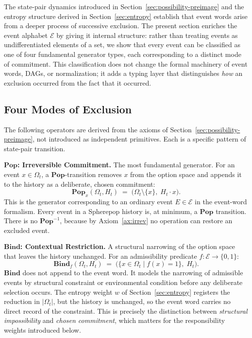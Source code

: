 \documentclass[12pt]{article}
\theoremstyle{plain}
\theoremstyle{definition}
\theoremstyle{remark}
\begin{document}
The state-pair dynamics introduced in Section~\ref{sec:possibility-preimage}
and the entropy structure derived in Section~\ref{sec:entropy} establish that
event words arise from a deeper process of successive exclusion.  The present
section enriches the event alphabet $\mathcal{E}$ by giving it internal
structure: rather than treating events as undifferentiated elements of a set,
we show that every event can be classified as one of four fundamental generator
types, each corresponding to a distinct mode of commitment.  This classification
does not change the formal machinery of event words, DAGs, or normalization;
it adds a typing layer that distinguishes \emph{how} an exclusion occurred from
the fact that it occurred.

\subsection{Four Modes of Exclusion}

The following operators are derived from the axioms of
Section~\ref{sec:possibility-preimage}, not introduced as independent
primitives.  Each is a specific pattern of state-pair transition.

\medskip
\noindent\textbf{$\mathbf{Pop}$: Irreversible Commitment.}
The most fundamental generator.  For an event $x \in \Omega_t$, a
$\mathbf{Pop}$-transition removes $x$ from the option space and appends it
to the history as a deliberate, chosen commitment:
\[
  \mathbf{Pop}_x(\Omega_t, H_t) \;=\; \bigl(\Omega_t \setminus \{x\},\; H_t \cdot x\bigr).
\]
This is the generator corresponding to an ordinary event $E \in \mathcal{E}$
in the event-word formalism.  Every event in a Spherepop history is, at minimum,
a $\mathbf{Pop}$ transition.  There is no $\mathbf{Pop}^{-1}$, because by
Axiom~\ref{ax:irrev} no operation can restore an excluded event.

\medskip
\noindent\textbf{$\mathbf{Bind}$: Contextual Restriction.}
A structural narrowing of the option space that leaves the history unchanged.
For an admissibility predicate $f : \mathcal{E} \to \{0,1\}$:
\[
  \mathbf{Bind}_f(\Omega_t, H_t) \;=\; \bigl(\{x \in \Omega_t \mid f(x) = 1\},\; H_t\bigr).
\]
$\mathbf{Bind}$ does not append to the event word.  It models the narrowing of
admissible events by structural constraint or environmental condition before any
deliberate selection occurs.  The entropy weight $w$ of Section~\ref{sec:entropy}
registers the reduction in $|\Omega_t|$, but the history is unchanged, so the
event word carries no direct record of the constraint.  This is precisely the
distinction between \emph{structural impossibility} and \emph{chosen
commitment}, which matters for the responsibility weights introduced below.
\end{document}
